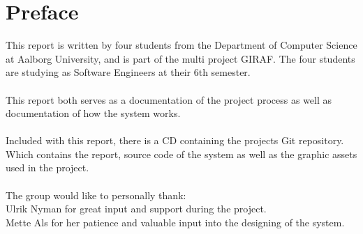 \chapter*{Preface}
\label{chap:preface}
This report is written by four students from the Department of Computer Science at Aalborg University, and is part of the multi project GIRAF. The four students are studying as Software Engineers at their 6th semester.\\
\\
This report both serves as a documentation of the project process as well as documentation of how the system works.\\
\\
Included with this report, there is a CD containing the projects Git repository. Which contains the report, source code of the system as well as the graphic assets used in the project.\\
\\
The group would like to personally thank:\\
Ulrik Nyman for great input and support during the project.\\
Mette Als for her patience and valuable input into the designing of the system.\\
